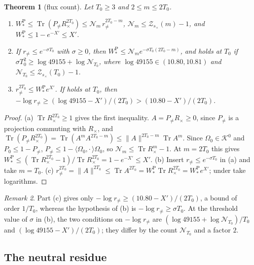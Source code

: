 \documentclass[11pt,a4paper]{amsart}
\newtheorem{theorem}{Theorem}[section]
\theoremstyle{definition}
\theoremstyle{remark}
\newtheorem{remark}[theorem]{Remark}
\numberwithin{equation}{section}
\DeclareMathOperator{\Tr}{Tr}        %
\newcommand{\Kspace}{\mathcal{K}}    %
\newcommand{\ip}[2]{\langle #1,#2\rangle}  %
\newcommand{\norm}[1]{\lVert #1\rVert}     %
\newcommand{\TT}{\mathbb{T}}               %
\newcommand{\Zc}{\mathcal{Z}}              %
\newcommand{\Zs}[2]{\Zc_{#1}(#2)}          %
\newcommand{\Omegazero}{\Omega_0}          %
\newcommand{\hypP}{\text{\upshape(P)}}              %
\begin{document}
\begin{theorem}[flux count]\label{thm:flux-count}
Let $T_0\ge3$ and $2\le m\le2T_0$.
\begin{enumerate}[label=\textup{(\alph*)},leftmargin=*]
\item $W^{\mathrm P}_*\le\Tr(P_{\ne}R_\times^{2T_0})\le\mathcal N_m\,r_{\ne}^{2T_0-m}$, $\mathcal N_m\le\Zs{s_\times}{m}-1$, and $W^{\mathrm P}_*\le1-e^{-X'}\le X'$.
\item If $r_{\ne}\le e^{-\sigma T_0}$ with $\sigma\ge0$, then $W^{\mathrm P}_*\le\mathcal N_me^{-\sigma T_0(2T_0-m)}$, and \hypP{} holds at $T_0$ if $\sigma T_0^2\ge\log49155+\log\mathcal N_{T_0}$, where $\log49155\in(10.80,10.81)$ and $\mathcal N_{T_0}\le\Zs{s_\times}{T_0}-1$.
\item $r_{\ne}^{2T_0}\le W^{\mathrm P}_*e^{X'}$. If \hypP{} holds at $T_0$, then $-\log r_{\ne}\ge(\log49155-X')/(2T_0)>(10.80-X')/(2T_0)$.
\end{enumerate}
\end{theorem}

\begin{proof}
(a) $\Tr R_\times^{2T_0}\ge1$ gives the first inequality. $A=P_{\ne}R_\times\ge0$, since $P_{\ne}$ is a projection commuting with $R_\times$, and $\Tr(P_{\ne}R_\times^{2T_0})=\Tr(A^mA^{2T_0-m})\le\norm{A}^{2T_0-m}\Tr A^m$. Since $\Omegazero\in\Kspace^0$ and $P_0\le1-P_{\ne}$, $P_{\ne}\le1-\ip{\Omegazero}{\cdot\,}\Omegazero$, so $\mathcal N_m\le\Tr R_\times^m-1$. At $m=2T_0$ this gives $W^{\mathrm P}_*\le(\Tr R_\times^{2T_0}-1)/\Tr R_\times^{2T_0}=1-e^{-X'}\le X'$. (b) Insert $r_{\ne}\le e^{-\sigma T_0}$ in (a) and take $m=T_0$. (c) $r_{\ne}^{2T_0}=\norm{A}^{2T_0}\le\Tr A^{2T_0}=W^{\mathrm P}_*\Tr R_\times^{2T_0}=W^{\mathrm P}_*e^{X'}$; under \hypP{} take logarithms.
\end{proof}

\begin{remark}
Part (c) gives only $-\log r_{\ne}\ge(10.80-X')/(2T_0)$, a bound of order $1/T_0$, whereas the hypothesis of (b) is $-\log r_{\ne}\ge\sigma T_0$. At the threshold value of $\sigma$ in (b), the two conditions on $-\log r_{\ne}$ are $(\log49155+\log\mathcal N_{T_0})/T_0$ and $(\log49155-X')/(2T_0)$; they differ by the count $\mathcal N_{T_0}$ and a factor $2$.
\end{remark}

\subsection{The neutral residue}
\end{document}
